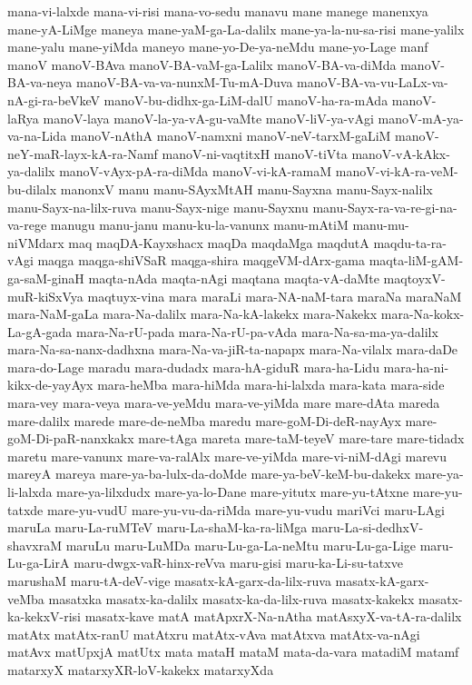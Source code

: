 {mana-vi-lalxde
mana-vi-risi
mana-vo-sedu
manavu
mane
manege
manenxya
mane-yA-LiMge
maneya
mane-yaM-ga-La-dalilx
mane-ya-la-nu-sa-risi
mane-yalilx
mane-yalu
mane-yiMda
maneyo
mane-yo-De-ya-neMdu
mane-yo-Lage
manf
manoV
manoV-BAva
manoV-BA-vaM-ga-Lalilx
manoV-BA-va-diMda
manoV-BA-va-neya
manoV-BA-va-va-nunxM-Tu-mA-Duva
manoV-BA-va-vu-LaLx-va-nA-gi-ra-beVkeV
manoV-bu-didhx-ga-LiM-dalU
manoV-ha-ra-mAda
manoV-laRya
manoV-laya
manoV-la-ya-vA-gu-vaMte
manoV-liV-ya-vAgi
manoV-mA-ya-va-na-Lida
manoV-nAthA
manoV-namxni
manoV-neV-tarxM-gaLiM
manoV-neY-maR-layx-kA-ra-Namf
manoV-ni-vaqtitxH
manoV-tiVta
manoV-vA-kAkx-ya-dalilx
manoV-vAyx-pA-ra-diMda
manoV-vi-kA-ramaM
manoV-vi-kA-ra-veM-bu-dilalx
manonxV
manu
manu-SAyxMtAH
manu-Sayxna
manu-Sayx-nalilx
manu-Sayx-na-lilx-ruva
manu-Sayx-nige
manu-Sayxnu
manu-Sayx-ra-va-re-gi-na-va-rege
manugu
manu-janu
manu-ku-la-vanunx
manu-mAtiM
manu-mu-niVMdarx
maq
maqDA-Kayxshacx
maqDa
maqdaMga
maqdutA
maqdu-ta-ra-vAgi
maqga
maqga-shiVSaR
maqga-shira
maqgeVM-dArx-gama
maqta-liM-gAM-ga-saM-ginaH
maqta-nAda
maqta-nAgi
maqtana
maqta-vA-daMte
maqtoyxV-muR-kiSxVya
maqtuyx-vina
mara
maraLi
mara-NA-naM-tara
maraNa
maraNaM
mara-NaM-gaLa
mara-Na-dalilx
mara-Na-kA-lakekx
mara-Nakekx
mara-Na-kokx-La-gA-gada
mara-Na-rU-pada
mara-Na-rU-pa-vAda
mara-Na-sa-ma-ya-dalilx
mara-Na-sa-nanx-dadhxna
mara-Na-va-jiR-ta-napapx
mara-Na-vilalx
mara-daDe
mara-do-Lage
maradu
mara-dudadx
mara-hA-giduR
mara-ha-Lidu
mara-ha-ni-kikx-de-yayAyx
mara-heMba
mara-hiMda
mara-hi-lalxda
mara-kata
mara-side
mara-vey
mara-veya
mara-ve-yeMdu
mara-ve-yiMda
mare
mare-dAta
mareda
mare-dalilx
marede
mare-de-neMba
maredu
mare-goM-Di-deR-nayAyx
mare-goM-Di-paR-nanxkakx
mare-tAga
mareta
mare-taM-teyeV
mare-tare
mare-tidadx
maretu
mare-vanunx
mare-va-ralAlx
mare-ve-yiMda
mare-vi-niM-dAgi
marevu
mareyA
mareya
mare-ya-ba-lulx-da-doMde
mare-ya-beV-keM-bu-dakekx
mare-ya-li-lalxda
mare-ya-lilxdudx
mare-ya-lo-Dane
mare-yitutx
mare-yu-tAtxne
mare-yu-tatxde
mare-yu-vudU
mare-yu-vu-da-riMda
mare-yu-vudu
mariVci
maru-LAgi
maruLa
maru-La-ruMTeV
maru-La-shaM-ka-ra-liMga
maru-La-si-dedhxV-shavxraM
maruLu
maru-LuMDa
maru-Lu-ga-La-neMtu
maru-Lu-ga-Lige
maru-Lu-ga-LirA
maru-dwgx-vaR-hinx-reVva
maru-gisi
maru-ka-Li-su-tatxve
marushaM
maru-tA-deV-vige
masatx-kA-garx-da-lilx-ruva
masatx-kA-garx-veMba
masatxka
masatx-ka-dalilx
masatx-ka-da-lilx-ruva
masatx-kakekx
masatx-ka-kekxV-risi
masatx-kave
matA
matApxrX-Na-nAtha
matAsxyX-va-tA-ra-dalilx
matAtx
matAtx-ranU
matAtxru
matAtx-vAva
matAtxva
matAtx-va-nAgi
matAvx
matUpxjA
matUtx
mata
mataH
mataM
mata-da-vara
matadiM
matamf
matarxyX
matarxyXR-loV-kakekx
matarxyXda
}
